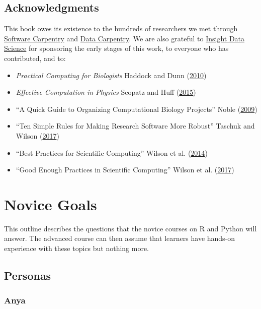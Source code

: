 \documentclass[]{Nemilov}
\providecommand{\tightlist}{%
  \setlength{\itemsep}{0pt}\setlength{\parskip}{0pt}}
\begin{document}
\hypertarget{overview-ack}{%
\section{Acknowledgments}\label{overview-ack}}

This book owes its existence to
the hundreds of researchers we met through \href{http://software-carpentry.org}{Software Carpentry} and \href{https://datacarpentry.org/}{Data Carpentry}.
We are also grateful to \href{https://www.insightdatascience.com/}{Insight Data Science} for sponsoring the early stages of this work,
to everyone who has contributed,
and to:

\begin{itemize}
\tightlist
\item
  \emph{Practical Computing for Biologists} Haddock and Dunn (\protect\hyperlink{ref-Hadd2010}{2010})
\item
  \emph{Effective Computation in Physics} Scopatz and Huff (\protect\hyperlink{ref-Scop2015}{2015})
\item
  ``A Quick Guide to Organizing Computational Biology Projects'' Noble (\protect\hyperlink{ref-Nobl2009}{2009})
\item
  ``Ten Simple Rules for Making Research Software More Robust'' Taschuk and Wilson (\protect\hyperlink{ref-Tasc2017}{2017})
\item
  ``Best Practices for Scientific Computing'' Wilson et al. (\protect\hyperlink{ref-Wils2014}{2014})
\item
  ``Good Enough Practices in Scientific Computing'' Wilson et al. (\protect\hyperlink{ref-Wils2017}{2017})
\end{itemize}

\hypertarget{novice-goals}{%
\chapter{Novice Goals}\label{novice-goals}}

This outline describes the questions that the novice courses on R and Python will answer.
The advanced course can then assume that learners have hands-on experience with these topics
but nothing more.

\hypertarget{personas}{%
\section{Personas}\label{personas}}

\hypertarget{anya}{%
\subsection{Anya}\label{anya}}
\end{document}
